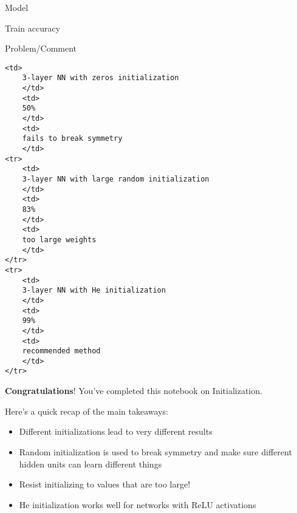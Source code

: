 \documentclass[11pt]{article}
\makeatletter
\providecommand{\tightlist}{%
      \setlength{\itemsep}{0pt}\setlength{\parskip}{0pt}}
\newcommand{\boxspacing}{\kern\kvtcb@left@rule\kern\kvtcb@boxsep}
\newcommand{\prompt}[4]{
        \ttfamily\llap{{\color{#2}[#3]:\hspace{3pt}#4}}\vspace{-\baselineskip}
    }
\makeatother
\begin{document}
Model

Train accuracy

Problem/Comment

\begin{verbatim}
<td>
    3-layer NN with zeros initialization
    </td>
    <td>
    50%
    </td>
    <td>
    fails to break symmetry
    </td>
<tr>
    <td>
    3-layer NN with large random initialization
    </td>
    <td>
    83%
    </td>
    <td>
    too large weights 
    </td>
</tr>
<tr>
    <td>
    3-layer NN with He initialization
    </td>
    <td>
    99%
    </td>
    <td>
    recommended method
    </td>
</tr>
\end{verbatim}

    \textbf{Congratulations}! You've completed this notebook on
Initialization.

Here's a quick recap of the main takeaways:

\begin{itemize}
\tightlist
\item
  Different initializations lead to very different results
\item
  Random initialization is used to break symmetry and make sure
  different hidden units can learn different things
\item
  Resist initializing to values that are too large!
\item
  He initialization works well for networks with ReLU activations
\end{itemize}

    \begin{tcolorbox}[breakable, size=fbox, boxrule=1pt, pad at break*=1mm,colback=cellbackground, colframe=cellborder]
\prompt{In}{incolor}{ }{\boxspacing}
\begin{Verbatim}[commandchars=\\\{\}]

\end{Verbatim}
\end{tcolorbox}


    
    
    
\end{document}
